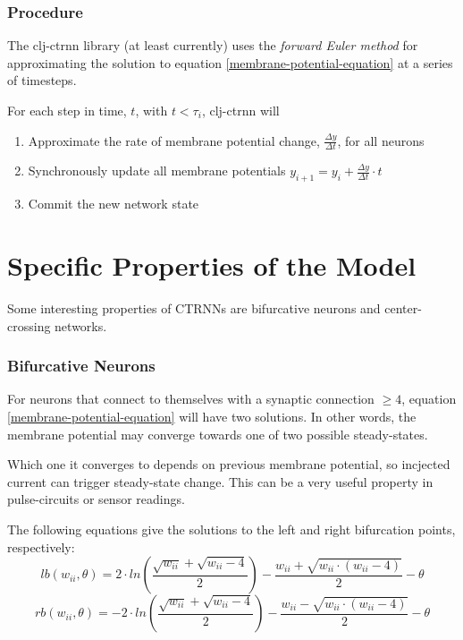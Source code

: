 \documentclass[a4paper]{article}
\begin{document}
\subsubsection{Procedure}
The clj-ctrnn library (at least currently) uses the \textit{forward Euler method} for approximating the solution to equation \ref{membrane-potential-equation} at a series of timesteps.

For each step in time, $t$, with $t<\tau_i$, clj-ctrnn will
\begin{enumerate}
\item Approximate the rate of membrane potential change, $\frac{\Delta y}{\Delta t}$, for all neurons
\item Synchronously update all membrane potentials $y_{i+1} = y_i + \frac{\Delta y}{\Delta t} \cdot t$
\item Commit the new network state
\end{enumerate}

\section{Specific Properties of the Model}
Some interesting properties of CTRNNs are bifurcative neurons and center-crossing networks.
\subsubsection{Bifurcative Neurons}
For neurons that connect to themselves with a synaptic connection $\geq4$, equation \ref{membrane-potential-equation} will have two solutions. In other words, the membrane potential may converge towards one of two possible steady-states.

Which one it converges to depends on previous membrane potential, so incjected current can trigger steady-state change. This can be a very useful property in pulse-circuits or sensor readings.

The following equations give the solutions to the left and right bifurcation points, respectively:
\begin{equation}
  lb(w_{ii},\theta) = 2 \cdot ln(\frac{\sqrt{w_{ii}} + \sqrt{w_{ii} - 4}}{2}) - \frac{w_{ii} + \sqrt{w_{ii} \cdot (w_{ii} - 4)}}{2} - \theta
\end{equation}
\begin{equation}
  rb(w_{ii},\theta) = -2 \cdot ln(\frac{\sqrt{w_{ii}} + \sqrt{w_{ii} - 4}}{2}) - \frac{w_{ii} - \sqrt{w_{ii} \cdot (w_{ii} - 4)}}{2} - \theta
\end{equation}
\end{document}
